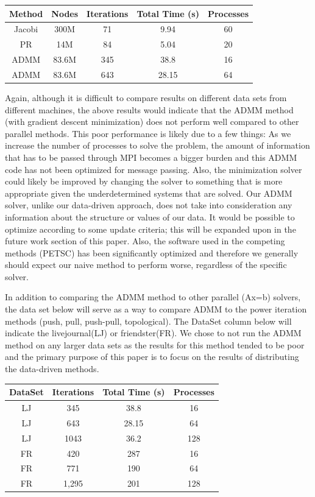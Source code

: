 \documentclass[letterpaper,11pt,onecolumn]{article}
\begin{document}
\begin{center}
  \begin{tabular}{c|c|c|c|c}
	\hline
	Method & Nodes & Iterations & Total Time (s) & Processes \\
	\hline\hline
	Jacobi & 300M & 71 & 9.94 & 60\\
	PR & 14M & 84  & 5.04 & 20 \\ 
	ADMM & 83.6M & 345 & 38.8  & 16 \\
	ADMM & 83.6M & 643 & 28.15 & 64 \\
  \end{tabular}
\end{center}

Again, although it is difficult to compare results on different data sets from different machines, the above results would indicate that the ADMM method (with gradient descent minimization) does not perform well compared to other parallel methods. This poor performance is likely due to a few things: As we increase the number of processes to solve the problem, the amount of information that has to be passed through MPI becomes a bigger burden and this ADMM code has not been optimized for message passing. Also, the minimization solver could likely be improved by changing the solver to something that is more appropriate given the underdetermined systems that are solved. Our ADMM solver, unlike our data-driven approach, does not take into consideration any information about the structure or values of our data. It would be possible to optimize according to some update criteria; this will be expanded upon in the future work section of this paper. Also, the software used in the competing methods (PETSC) has been significantly optimized and therefore we generally should expect our naive method to perform worse, regardless of the specific solver.

In addition to comparing the ADMM method to other parallel (Ax=b) solvers, the data set below will serve as a way to compare ADMM to the power iteration methods (push, pull, push-pull, topological). The DataSet column below will indicate the livejournal(LJ) or friendster(FR). We chose to not run the ADMM method on any larger data sets as the results for this method tended to be poor and the primary purpose of this paper is to focus on the results of distributing the data-driven methods.


\begin{center}
  \begin{tabular}{c|c|c|c}
	\hline
	DataSet & Iterations & Total Time (s) & Processes \\
	\hline\hline
	LJ & 345 & 38.8  & 16 \\
	LJ & 643 & 28.15 & 64 \\
	LJ & 1043 & 36.2 & 128 \\
	FR & 420 & 287 & 16 \\
	FR & 771 & 190 & 64 \\
	FR & 1,295 & 201 & 128 \\
  \end{tabular}
\end{center}
\end{document}
